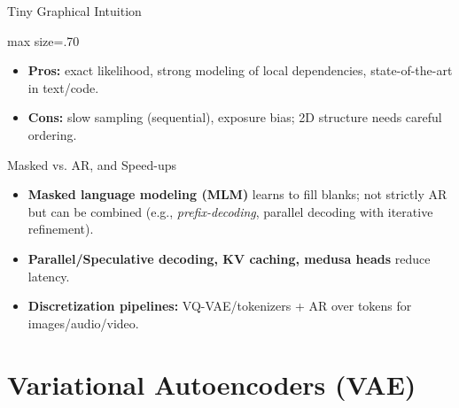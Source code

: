 \documentclass[aspectratio=169]{beamer}
\begin{document}
\begin{frame}{Tiny Graphical Intuition}
\centering
\begin{adjustbox}{max size={\linewidth}{.70\textheight}}\end{adjustbox}
\vspace{0.7em}
\begin{itemize}
  \item \textbf{Pros:} exact likelihood, strong modeling of local dependencies, state-of-the-art in text/code.
  \item \textbf{Cons:} slow sampling (sequential), exposure bias; 2D structure needs careful ordering.
\end{itemize}
\end{frame}

\begin{frame}{Masked vs. AR, and Speed-ups}
\begin{itemize}
  \item \textbf{Masked language modeling (MLM)} learns to fill blanks; not strictly AR but can be combined (e.g., \emph{prefix-decoding}, parallel decoding with iterative refinement).
  \item \textbf{Parallel/Speculative decoding, KV caching, medusa heads} reduce latency.
  \item \textbf{Discretization pipelines:} VQ-VAE/tokenizers + AR over tokens for images/audio/video.
\end{itemize}
\end{frame}

\section{Variational Autoencoders (VAE)}
\end{document}

